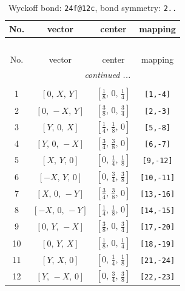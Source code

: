 \documentclass[fleqn,8pt]{jsarticle}
\begin{document}
\renewcommand{\arraystretch}{1.2}
\begin{longtable}{cccc}
\caption{Wyckoff bond: {\tt 24f@12c}, bond symmetry: {\tt 2..}}
 \\
 \hline \hline
No. & vector & center & mapping \\ \hline \endfirsthead

\multicolumn{3}{l}{\tablename\ \thetable{}} \\
 \hline \hline
No. & vector & center & mapping \\ \hline \endhead

 \hline \hline
\multicolumn{3}{r}{\footnotesize\it continued ...} \\ \endfoot

 \hline \hline
\multicolumn{3}{r}{} \\ \endlastfoot

1 & $\left[ 0,\, X,\, Y \right]$ & $\left[ \frac{1}{8},\, 0,\, \frac{1}{4} \right]$ & {\tt [1,-4]} \\ \hline
2 & $\left[ 0,\, - X,\, Y \right]$ & $\left[ \frac{3}{8},\, 0,\, \frac{3}{4} \right]$ & {\tt [2,-3]} \\ \hline
3 & $\left[ Y,\, 0,\, X \right]$ & $\left[ \frac{1}{4},\, \frac{1}{8},\, 0 \right]$ & {\tt [5,-8]} \\ \hline
4 & $\left[ Y,\, 0,\, - X \right]$ & $\left[ \frac{3}{4},\, \frac{3}{8},\, 0 \right]$ & {\tt [6,-7]} \\ \hline
5 & $\left[ X,\, Y,\, 0 \right]$ & $\left[ 0,\, \frac{1}{4},\, \frac{1}{8} \right]$ & {\tt [9,-12]} \\ \hline
6 & $\left[ - X,\, Y,\, 0 \right]$ & $\left[ 0,\, \frac{3}{4},\, \frac{3}{8} \right]$ & {\tt [10,-11]} \\ \hline
7 & $\left[ X,\, 0,\, - Y \right]$ & $\left[ \frac{3}{4},\, \frac{3}{8},\, 0 \right]$ & {\tt [13,-16]} \\ \hline
8 & $\left[ - X,\, 0,\, - Y \right]$ & $\left[ \frac{1}{4},\, \frac{1}{8},\, 0 \right]$ & {\tt [14,-15]} \\ \hline
9 & $\left[ 0,\, Y,\, - X \right]$ & $\left[ \frac{3}{8},\, 0,\, \frac{3}{4} \right]$ & {\tt [17,-20]} \\ \hline
10 & $\left[ 0,\, Y,\, X \right]$ & $\left[ \frac{1}{8},\, 0,\, \frac{1}{4} \right]$ & {\tt [18,-19]} \\ \hline
11 & $\left[ Y,\, X,\, 0 \right]$ & $\left[ 0,\, \frac{1}{4},\, \frac{1}{8} \right]$ & {\tt [21,-24]} \\ \hline
12 & $\left[ Y,\, - X,\, 0 \right]$ & $\left[ 0,\, \frac{3}{4},\, \frac{3}{8} \right]$ & {\tt [22,-23]} \\
\end{longtable}
\end{document}

